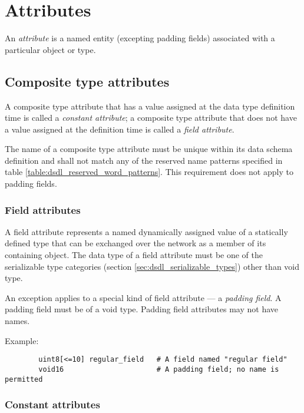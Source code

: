 \section{Attributes}\label{sec:dsdl_attributes}

An \emph{attribute} is a named entity (excepting padding fields) associated with a particular object or type.

\subsection{Composite type attributes}

A composite type attribute that has a value assigned at the data type definition time is called a
\emph{constant attribute};
a composite type attribute that does not have a value assigned at the definition time is called a
\emph{field attribute}.

The name of a composite type attribute must be unique within its data schema definition
and shall not match any of the reserved name patterns specified in table
\ref{table:dsdl_reserved_word_patterns}.
This requirement does not apply to padding fields.

\subsubsection{Field attributes}

A field attribute represents a named dynamically assigned value of a statically defined type
that can be exchanged over the network as a member of its containing object.
The data type of a field attribute must be one of the serializable type categories
(section \ref{sec:dsdl_serializable_types})
other than void type.

An exception applies to a special kind of field attribute --- a \emph{padding field}.
A padding field must be of a void type. Padding field attributes may not have names.

\begin{remark}
    Example:
    \begin{verbatim}
        uint8[<=10] regular_field   # A field named "regular field"
        void16                      # A padding field; no name is permitted
    \end{verbatim}
\end{remark}

\subsubsection{Constant attributes}

